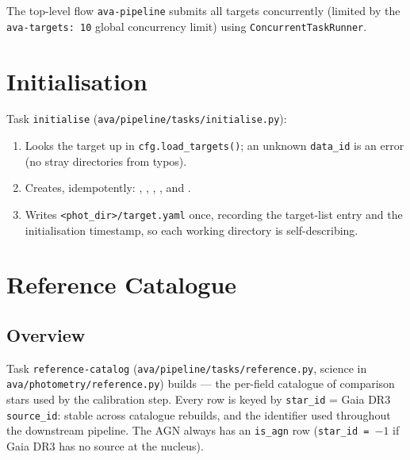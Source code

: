 \documentclass[12pt,a4paper]{article}
\begin{document}
The top-level flow \texttt{ava-pipeline} submits all targets concurrently
(limited by the \texttt{ava-targets: 10} global concurrency limit) using
\texttt{ConcurrentTaskRunner}.

\section{Initialisation}
\label{sec:init}

Task \texttt{initialise} (\texttt{ava/\hspace{0pt}pipeline/\hspace{0pt}tasks/\hspace{0pt}initialise.py}):

\begin{enumerate}
  \item Looks the target up in \texttt{cfg.load\_\hspace{0pt}targets()}; an unknown
        \texttt{data\_id} is an error (no stray directories from typos).
  \item Creates, idempotently: ,
        , ,
        , and .
  \item Writes \texttt{<phot\_\hspace{0pt}dir>/\hspace{0pt}target.yaml} once, recording the
        target-list entry and the initialisation timestamp, so each working
        directory is self-describing.
\end{enumerate}

\section{Reference Catalogue}
\label{sec:refcat}

\subsection{Overview}

Task \texttt{reference-catalog} (\texttt{ava/\hspace{0pt}pipeline/\hspace{0pt}tasks/\hspace{0pt}reference.py},
science in \texttt{ava/\hspace{0pt}photometry/\hspace{0pt}reference.py}) builds
 --- the per-field catalogue of comparison stars
used by the calibration step.  Every row is keyed by \texttt{star\_id} =
Gaia DR3 \texttt{source\_id}: stable across catalogue rebuilds, and the
identifier used throughout the downstream pipeline.  The AGN always has an
\texttt{is\_agn} row (\texttt{star\_id = $-1$} if Gaia DR3 has no source at
the nucleus).
\end{document}
